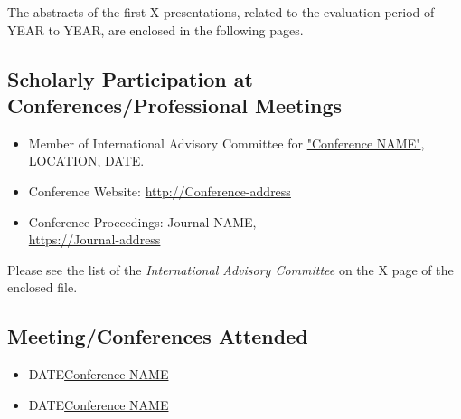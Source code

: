 The abstracts of the first X presentations, related to the evaluation period of YEAR to YEAR, are enclosed in the following pages.

\newpage







\newpage
\subsection{Scholarly Participation at Conferences/Professional Meetings}
\begin{itemize}
\item {}{Member of International Advisory Committee for \href{https://Conference_address}{"Conference NAME"}, LOCATION, DATE.}

\item Conference Website: \href{http://Conference-address}{http://Conference-address}

\item Conference Proceedings: Journal NAME, \\
\href{https://Journal-address}{https://Journal-address}
\end{itemize}

Please see the list of the {\it International Advisory Committee} on the X page of the enclosed file.

\newpage




\newpage
\subsection{Meeting/Conferences Attended}

\begin{itemize}

\item{DATE}{\quad \href{https://conference-address}{Conference NAME}}{}{}{}{}

\item{DATE}{\quad \href{https://conference-address}{Conference NAME}}{}{}{}{}


\end{itemize}




